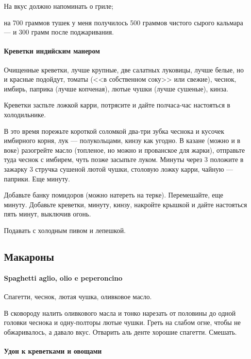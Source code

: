 \documentclass[11pt,a5paper]{article}
\begin{document}
На вкус должно напоминать о гриле;

на 700 граммов тушек у меня получилось 500 граммов чистого сырого кальмара --- и 300 грамм после поджаривания.
\paragraph{Креветки индийским манером} %

Очищенные креветки, лучше крупные, две салатных луковицы, лучше белые, но и красные подойдут, томаты (<<в собственном соку>> или свежие), чеснок, имбирь, паприка (лучше копченая), лютые чушки (лучше сушеные), кинза.

Креветки заспьте ложкой карри, потрясите и дайте полчаса-час настояться в холодильнике. 

В это время порежьте короткой соломкой два-три зубка чеснока и кусочек имбирного корня, лук --- полукольцами, кинзу как угодно. В казане (можно и в воке) разогрейте масло (топленое, но можно и прованское для жарки), отправьте туда чеснок с имбирем, чуть позже засыпьте луком. Минуты через 3 положите в зажарку 3 стручка сушеной лютой чушки, столовую ложку карри, чайную --- паприки. Еще минуту.

Добавьте банку помидоров (можно натереть на терке). Перемешайте, еще минуту. Добавьте креветки, минуту, кинзу, накройте крышкой и дайте настояться пять минут, выключив огонь.

Подавать с холодным пивом и лепешкой.

\subsection{Макароны}
\paragraph{Spaghetti aglio, olio e peperoncino} %

Спагетти, чеснок, лютая чушка, оливковое масло.

В сковороду налить оливкового масла и тонко нарезать от половины до одной головки чеснока и одну-полторы лютые чушки. Греть на слабом огне, чтобы не обжаривалось, а давало вкус. Отварить аль денте хорошие спагетти. Смешать.

\paragraph{Удон к креветками и овощами} %
\end{document}
